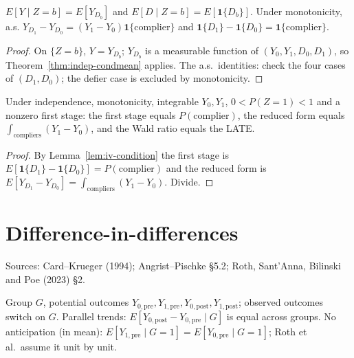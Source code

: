 \begin{lemma}
\label{lem:iv-condition}
\leanok
{}
$E[Y \mid Z = b] = E[Y_{D_b}]$ and $E[D\mid Z=b] = E[\mathbf 1\{D_b\}]$. Under monotonicity, a.s.
$Y_{D_1} - Y_{D_0} = (Y_1 - Y_0)\mathbf 1\{\text{complier}\}$ and $\mathbf 1\{D_1\} - \mathbf 1\{D_0\} = \mathbf 1\{\text{complier}\}$.
\end{lemma}
\begin{proof}
\leanok
{}
On $\{Z = b\}$, $Y = Y_{D_b}$; $Y_{D_b}$ is a measurable function of $(Y_0,Y_1,D_0,D_1)$, so
Theorem~\ref{thm:indep-condmean} applies. The a.s.\ identities: check the four cases of $(D_1, D_0)$; the defier case is
excluded by monotonicity.
\end{proof}

\begin{theorem}
\label{thm:late}
\leanok
{}
Under independence, monotonicity, integrable $Y_0, Y_1$, $0 < P(Z=1) < 1$ and a nonzero first stage: the first
stage equals $P(\text{complier})$, the reduced form equals $\int_{\text{compliers}}(Y_1 - Y_0)$, and the Wald ratio
equals the LATE.
\end{theorem}
\begin{proof}
\leanok
{}
By Lemma~\ref{lem:iv-condition} the first stage is $E[\mathbf 1\{D_1\} - \mathbf 1\{D_0\}] = P(\text{complier})$ and the
reduced form is $E[Y_{D_1} - Y_{D_0}] = \int_{\text{compliers}}(Y_1 - Y_0)$. Divide.
\end{proof}

\section{Difference-in-differences}
\label{sec:did}

Sources: Card--Krueger (1994); Angrist--Pischke \S5.2; Roth, Sant'Anna, Bilinski and Poe (2023) \S2.

\begin{definition}
\label{def:did}
\leanok
{}
Group $G$, potential outcomes $Y_{0,\mathrm{pre}}, Y_{1,\mathrm{pre}}, Y_{0,\mathrm{post}}, Y_{1,\mathrm{post}}$; observed outcomes
switch on $G$. Parallel trends: $E[Y_{0,\mathrm{post}} - Y_{0,\mathrm{pre}}\mid G]$ is equal across groups. No
anticipation (in mean): $E[Y_{1,\mathrm{pre}}\mid G = 1] = E[Y_{0,\mathrm{pre}}\mid G=1]$; Roth et al.\ assume it unit by unit.
\end{definition}

